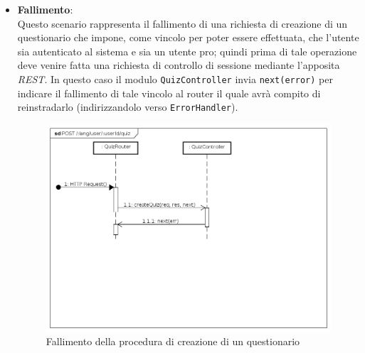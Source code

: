 \begin{itemize}
\item \textbf{Fallimento}:\\
Questo scenario rappresenta il fallimento di una richiesta di creazione di un questionario che impone, come vincolo per poter essere effettuata, che l'utente sia autenticato al sistema e sia un utente pro; quindi prima di tale operazione deve venire fatta una richiesta di controllo di sessione mediante l'apposita \textit{REST}. In questo caso il modulo \texttt{QuizController} invia \texttt{next(error)} per indicare il fallimento di tale vincolo al router il quale avrà compito di reinstradarlo (indirizzandolo verso \texttt{ErrorHandler}).
\label{Fallimento della procedura di creazione di un questionario}
\begin{figure}[ht]
	\centering
	\includegraphics[scale=0.40]{UML/DiagrammiDiSequenza/Back-end/POST__lang_user_userId_quiz_failure.png}
	\caption{Fallimento della procedura di creazione di un questionario}
\end{figure}
\FloatBarrier
\end{itemize}

